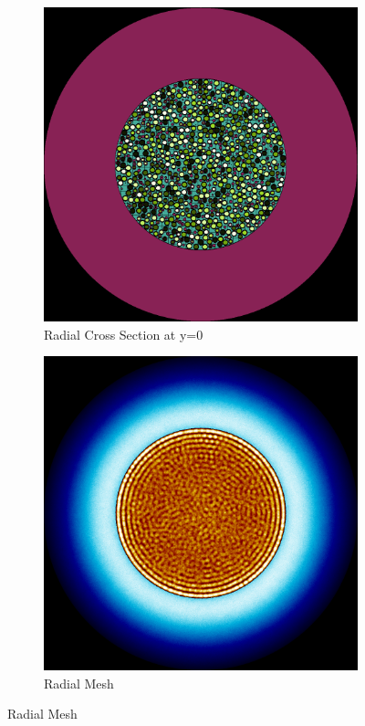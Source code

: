 \begin{figure}[H]
\centering

\begin{subfigure}{0.45\textwidth}
  \includegraphics[width=0.95\linewidth]{figures/6012345/6012345-r}
  \caption{Radial Cross Section at y=0}
  \label{fig:6012345-r}
\end{subfigure}%
%
\begin{subfigure}{0.45\textwidth}
  \includegraphics[width=0.95\linewidth]{figures/6012345/6012345-rm}
  \caption{Radial Mesh}
  \label{fig:6012345-rm}
\end{subfigure}


\end{figure}

